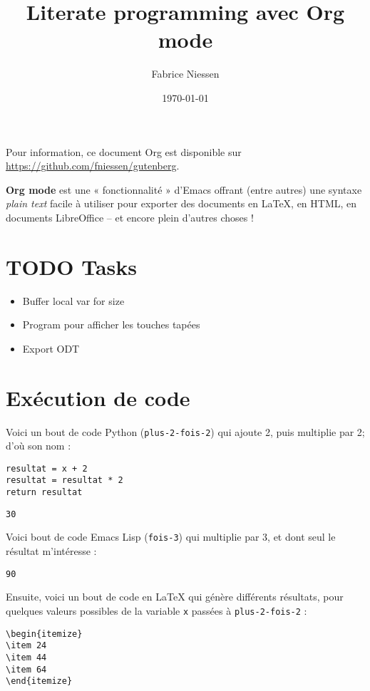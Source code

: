 \documentclass[french]{report}
\author{Fabrice Niessen}
\date{\today}
\title{Literate programming avec Org mode}
\begin{document}
\maketitle
Pour information, ce document Org est disponible sur
\url{https://github.com/fniessen/gutenberg}.

\textbf{Org mode} est une « fonctionnalité » d'Emacs offrant (entre autres) une syntaxe
\emph{plain text} facile à utiliser pour exporter des documents en \LaTeX{}, en HTML, en
documents LibreOffice -- et encore plein d'autres choses !

\part{{\color{red}\textbf{\textsc{\textsf{TODO}}}} Tasks}
\label{sec:org5ba00a8}

\begin{itemize}
\item Buffer local var for size
\item Program pour afficher les touches tapées
\item Export ODT
\end{itemize}

\part{Exécution de code}
\label{sec:org713d485}

Voici un bout de code Python (\texttt{plus-2-fois-2}) qui ajoute 2, puis multiplie par 2;
d'où son nom :

\lstset{language=Python,label=org75d32d6,caption= ,captionpos=b,numbers=none}
\begin{lstlisting}
resultat = x + 2
resultat = resultat * 2
return resultat
\end{lstlisting}

\begin{verbatim}
30
\end{verbatim}


Voici bout de code Emacs Lisp (\texttt{fois-3}) qui multiplie par 3, et dont seul le
résultat m'intéresse :

\begin{verbatim}
90
\end{verbatim}


Ensuite, voici un bout de code en \LaTeX{} qui génère différents résultats, pour
quelques valeurs possibles de la variable \texttt{x} passées à \texttt{plus-2-fois-2} :

\lstset{language=[LaTeX]TeX,label= ,caption= ,captionpos=b,numbers=none}
\begin{lstlisting}
\begin{itemize}
\item 24
\item 44
\item 64
\end{itemize}
\end{lstlisting}
\end{document}
